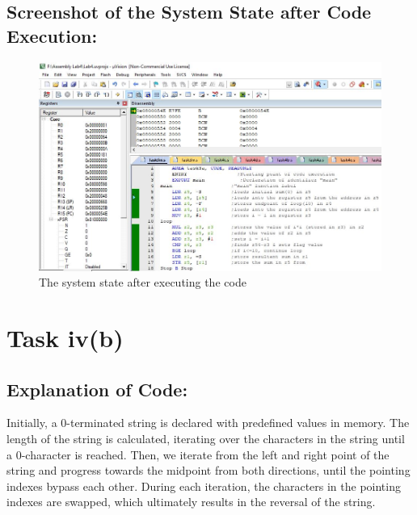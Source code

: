 \documentclass[12pt]{article}
\begin{document}
 \subsection{Screenshot of the System State after Code Execution:}
 \begin{figure}[ht]
     \centering
     \includegraphics[scale=.7]{images/aftertask3a.JPG}
     \caption{The system state after executing the code}
     \label{fig:after_task_four_a}
 \end{figure}
 \pagebreak\section{Task iv(b)}
\subsection{Explanation of Code:}
Initially, a 0-terminated string is declared with predefined values in memory. The length of the string is calculated, iterating over the characters in the string until a 0-character is reached. Then, we iterate from the left and right point of the string and progress towards the midpoint from both directions, until the pointing indexes bypass each other. During each iteration, the characters in the pointing indexes are swapped, which ultimately results in the reversal of the string.
\end{document}
